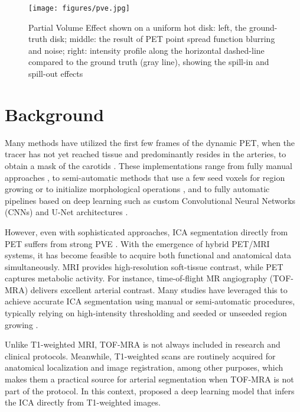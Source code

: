 \begin{figure}[h]
	\texttt{[image: figures/pve.jpg]}
	\caption{Partial Volume Effect shown on a uniform hot disk: left, the ground-truth disk; middle: the result of PET point spread function blurring and noise; right: intensity profile along the horizontal dashed-line compared to the ground truth (gray line), showing the spill-in and spill-out effects}
	\label{fig:pve}
\end{figure}
\section{Background}
Many methods have utilized the first few frames of the dynamic PET, when the tracer has not yet reached tissue and predominantly resides in the arteries, to obtain a mask of the carotids \cite{young2023image}.
These implementations range from fully manual approaches \cite{feng2015image}, to semi-automatic methods that use a few seed voxels for region growing or to initialize morphological operations \cite{vestergaard2021validation}, and to fully automatic pipelines based on deep learning such as custom Convolutional Neural Networks (CNNs) \cite{chen2025deep} and U-Net architectures \cite{chavan2024end}.

However, even with sophisticated approaches, ICA segmentation directly from PET suffers from strong PVE \cite{zanotti2011image,boellaard2004effects}.
With the emergence of hybrid PET/MRI systems, it has become feasible to acquire both functional and anatomical data simultaneously.
MRI provides high-resolution soft-tissue contrast, while PET captures metabolic activity.
For instance, time-of-flight MR angiography (TOF-MRA) delivers excellent arterial contrast.
Many studies have leveraged this to achieve accurate ICA segmentation using manual or semi-automatic procedures, typically relying on high-intensity thresholding and seeded or unseeded region growing \cite{feng2015image,sundar2019towards,sari2017estimation,jochimsen2016fully}.

Unlike T1-weighted MRI, TOF-MRA is not always included in research and clinical protocols.
Meanwhile, T1-weighted scans are routinely acquired for anatomical localization and image registration, among other purposes, which makes them a practical source for arterial segmentation when TOF-MRA is not part of the protocol.
In this context, \citeauthor{rahman2024deep} \cite{rahman2024deep} proposed a deep learning model that infers the ICA directly from T1-weighted images.

